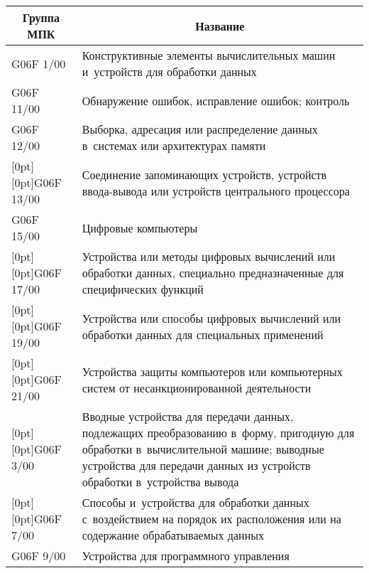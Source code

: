\begin{table*}\small %
\begin{center}
      \vspace*{2ex}
      
      \begin{tabular}{|l|p{137mm}|}
      \hline
\multicolumn{1}{|c|}{Группа МПК}&\multicolumn{1}{c|}{Название}\\
\hline
G06F 1/00&Конструктивные элементы вычислительных машин и~устройств для обработки 
данных\\
\hline
G06F 11/00&Обнаружение ошибок, исправление ошибок; контроль\\
\hline
G06F 12/00&Выборка, адресация или распределение данных в~системах или архитектурах 
памяти\\
\hline
\multicolumn{1}{|l|}{\raisebox{-6pt}[0pt][0pt]{G06F 13/00}}&Соединение запоминающих устройств, устройств ввода-вывода или устройств 
центрального процессора\\
\hline
G06F 15/00&Цифровые компьютеры\\
\hline
\multicolumn{1}{|l|}{\raisebox{-6pt}[0pt][0pt]{G06F 17/00}}&Устройства или методы цифровых вычислений или обработки данных, специально 
предназначенные для специфических функций\\
\hline
\multicolumn{1}{|l|}{\raisebox{-6pt}[0pt][0pt]{G06F 19/00}}&Устройства или способы цифровых вычислений или обработки данных для 
специальных применений\\
\hline
\multicolumn{1}{|l|}{\raisebox{-6pt}[0pt][0pt]{G06F 21/00}}&Устройства защиты компьютеров или компьютерных систем от 
несанкционированной деятельности\\
\hline
\multicolumn{1}{|l|}{\raisebox{-12pt}[0pt][0pt]{G06F 3/00}}&Вводные устройства для передачи данных, подлежащих преобразованию в~форму, 
пригодную для обработки в~вычислительной машине; выводные устройства для передачи 
данных из устройств обработки в~устройства вывода\\
\hline
\multicolumn{1}{|l|}{\raisebox{-6pt}[0pt][0pt]{G06F 7/00}}&Способы и~устройства для обработки данных с~воздействием на порядок их 
расположения или на содержание обрабатываемых данных\\
\hline
G06F 9/00&Устройства для программного управления\\
\hline
\end{tabular}
\end{center}
\end{table*}

